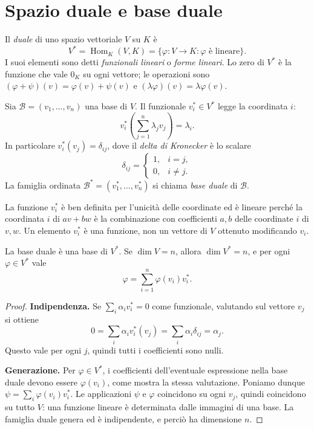 \section{Spazio duale e base duale}
\begin{definizione}
Il \emph{duale} di uno spazio vettoriale $V$ su $K$ è
\[
 V^*=\operatorname{Hom}_K(V,K)=\{\varphi:V\to K:\varphi\text{ è lineare}\}.
\]
I suoi elementi sono detti \emph{funzionali lineari} o \emph{forme lineari}. Lo zero di $V^*$ è la funzione che vale $0_K$ su ogni vettore; le operazioni sono $(\varphi+\psi)(v)=\varphi(v)+\psi(v)$ e $(\lambda\varphi)(v)=\lambda\varphi(v)$.
\end{definizione}
\begin{definizione}
Sia $\mathcal B=(v_1,\ldots,v_n)$ una base di $V$. Il funzionale $v_i^*\in V^*$ legge la coordinata $i$:
\[
 v_i^*\!\left(\sum_{j=1}^n\lambda_jv_j\right)=\lambda_i.
\]
In particolare $v_i^*(v_j)=\delta_{ij}$, dove il \emph{delta di Kronecker} è lo scalare
\[
 \delta_{ij}=\begin{cases}1,&i=j,\\0,&i\ne j.\end{cases}
\]
La famiglia ordinata $\mathcal B^*=(v_1^*,\ldots,v_n^*)$ si chiama \emph{base duale} di $\mathcal B$.
\end{definizione}
La funzione $v_i^*$ è ben definita per l'unicità delle coordinate ed è lineare perché la coordinata $i$ di $av+bw$ è la combinazione con coefficienti $a,b$ delle coordinate $i$ di $v,w$. Un elemento $v_i^*$ è una funzione, non un vettore di $V$ ottenuto modificando $v_i$.

\begin{teorema}
La base duale è una base di $V^*$. Se $\dim V=n$, allora $\dim V^*=n$, e per ogni $\varphi\in V^*$ vale
\[
 \varphi=\sum_{i=1}^n\varphi(v_i)v_i^*.
\]
\end{teorema}
\begin{proof}
\textbf{Indipendenza.} Se $\sum_i\alpha_iv_i^*=0$ come funzionale, valutando sul vettore $v_j$ si ottiene
\[
 0=\sum_i\alpha_iv_i^*(v_j)=\sum_i\alpha_i\delta_{ij}=\alpha_j.
\]
Questo vale per ogni $j$, quindi tutti i coefficienti sono nulli.

\textbf{Generazione.} Per $\varphi\in V^*$, i coefficienti dell'eventuale espressione nella base duale devono essere $\varphi(v_i)$, come mostra la stessa valutazione. Poniamo dunque $\psi=\sum_i\varphi(v_i)v_i^*$. Le applicazioni $\psi$ e $\varphi$ coincidono su ogni $v_j$, quindi coincidono su tutto $V$: una funzione lineare è determinata dalle immagini di una base. La famiglia duale genera ed è indipendente, e perciò ha dimensione $n$.
\end{proof}

